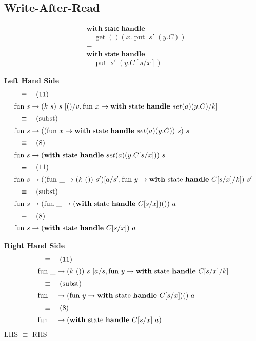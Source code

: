 \documentclass[logo,bsc,singlespacing,parskip]{infthesis}
\begin{document}
\subsection*{Write-After-Read}
\[
\begin{aligned}
    &\mathsf{\textbf{with}} \; \mathsf{state} \; \mathsf{\textbf{handle}} \\
    &\quad \operatorname{get}() \left( x. \operatorname{put} \; s' \; (y. C) \right) \\
    &\equiv \\
    &\mathsf{\textbf{with}} \; \mathsf{state} \; \mathsf{\textbf{handle}} \\
    &\quad \operatorname{put} \; s' \; (y. C[s/x])
\end{aligned}
\]

\textbf{Left Hand Side}
\[ 
\begin{array}{l}
\quad\equiv\quad (11) \\[5pt]
\text{fun } s \rightarrow (k\ s)\ s\ [()/v, \text{fun } x \rightarrow \text{\textbf{with} state \textbf{handle} } set(a)(y.C)/k] \\[5pt]
\quad\equiv\quad (\text{subst}) \\[5pt]
\text{fun } s \rightarrow ((\text{fun } x \rightarrow \text{\textbf{with} state \textbf{handle} } set(a)(y.C))\ s)\ s \\[5pt]
\quad\equiv\quad (8) \\[5pt]
\text{fun } s \rightarrow (\text{\textbf{with} state \textbf{handle} } set(a)(y.C[s/x]))\ s \\[5pt]
\quad\equiv\quad (11) \\[5pt]
\text{fun } s \rightarrow ((\text{fun } \_ \rightarrow (k\ ())\ s')[a/s', \text{fun } y \rightarrow \text{\textbf{with} state \textbf{handle} } C[s/x]/k])\ s' \\[5pt]
\quad\equiv\quad (\text{subst}) \\[5pt]
\text{fun } s \rightarrow (\text{fun } \_ \rightarrow (\text{\textbf{with} state \textbf{handle} } C[s/x]) ())\ a \\[5pt]
\quad\equiv\quad (8) \\[5pt]
\text{fun } s \rightarrow (\text{\textbf{with} state \textbf{handle} } C[s/x])\ a
\end{array}
\]


\textbf{Right Hand Side}
\[ 
\begin{array}{l}
\quad\equiv\quad (11) \\[5pt]
\text{fun }\_ \rightarrow (k\ ())\ s\ [a/s, \text{fun } y \rightarrow \text{\textbf{with} state \textbf{handle} } C[s/x]/k] \\[5pt]
\quad\equiv\quad (\text{subst}) \\[5pt]
\text{fun }\_ \rightarrow (\text{fun } y \rightarrow \text{\textbf{with} state \textbf{handle} } C[s/x]) ()\ a \\[5pt]
\quad\equiv\quad (8) \\[5pt]
\text{fun }\_ \rightarrow (\text{\textbf{with} state \textbf{handle} } C[s/x]\ a)
\end{array}
\]
LHS $\equiv$ RHS
\end{document}
